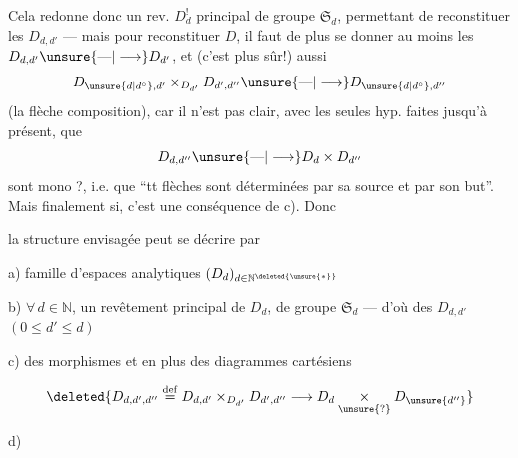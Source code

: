 Cela redonne donc un rev. $D^!_d$ principal de groupe $\mathfrak S_d$, permettant de reconstituer les $D_{d,d'}$ --- mais pour reconstituer $D$, il faut de plus se donner  au moins les $D_{d,d'}\unsure{\text{---}|\longrightarrow}D_{d'}$, et (c'est plus sûr!) aussi
\[
D_{\unsure{d|d^\circ},d'}\mathbin{\times}_{D_{d'}}D_{d',d''}\unsure{\text{---}|\longrightarrow}D_{\unsure{d|d^\circ},d''}
\]
(la flèche composition), car il n'est pas clair, avec les seules hyp. faites jusqu'à présent, que  
\[
D_{d,d''}\unsure{\text{---}|\longrightarrow}D_d\times D_{d''}
\]
sont mono ?, i.e. que ``tt flèches sont déterminées par sa source et par son but''. Mais finalement si, c'est une conséquence de c). Donc

la structure envisagée peut se décrire par

a) famille d'espaces analytiques $(D_d)_{d\in\mathbb N^{\deleted{\unsure{*}}}}$

b) $\forall\,d\in\mathbb N$, un revêtement principal  de $D_d$, de groupe $\mathfrak S_d$ --- d'où des $D_{d,d'}$ $(0\leq d'\leq d)$


c) des morphismes
et en plus des diagrammes cartésiens

\[\deleted{D_{d,d',d''}\overset{\mathrm{def}}{=}D_{d,d'}\mathbin\times_{D_{d'}}D_{d',d''}\longrightarrow D_d\mathbin{\underset{\unsure{?}}{\times}}D_{\unsure{d''}}}\]

d)

